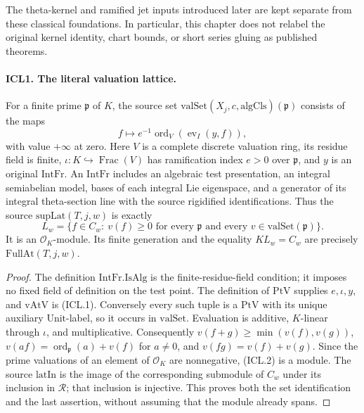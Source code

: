 The theta-kernel and ramified jet inputs introduced later are kept
separate from these classical foundations.  In particular, this chapter
does not relabel the original kernel identity, chart bounds, or short
series gluing as published theorems.

\paragraph{ICL1. The literal valuation lattice.}
\label{claim:ICL1}
For a finite prime \(\mathfrak p\) of \(K\), the source set
\(\mathrm{valSet}(X_j,c,\mathrm{algCls})(\mathfrak p)\) consists of the maps
\[
 f\longmapsto e^{-1}\operatorname{ord}_{V}
                 (\operatorname{ev}_{I}(y,f)),                 \tag{ICL.1}
\]
with value \(+\infty\) at zero.  Here \(V\) is a complete discrete
valuation ring, its residue field is finite, \(\iota:K\hookrightarrow
\operatorname{Frac}(V)\) has ramification index \(e>0\) over
\(\mathfrak p\), and \(y\) is an original \(\mathrm{IntFr}\).
An \(\mathrm{IntFr}\) includes an algebraic test presentation, an integral
semiabelian model, bases of each integral Lie eigenspace, and a generator
of its integral theta-section line with the source rigidified
identifications.  Thus the source \(\mathrm{supLat}(T,j,w)\) is exactly
\[
 L_w=\{f\in C_w:\ v(f)\geq0\text{ for every }\mathfrak p
           \text{ and every }v\in\mathrm{valSet}(\mathfrak p)\}. \tag{ICL.2}
\]
It is an \(\mathcal O_K\)-module.  Its finite generation and the equality
\(K L_w=C_w\) are precisely \(\mathrm{FullAt}(T,j,w)\).
\begin{proof}
The definition \(\mathrm{IntFr.IsAlg}\) is the finite-residue-field
condition; it imposes no fixed field of definition on the test point.
The definition of \(\mathrm{PtV}\) supplies \(e,\iota,y\), and
\(\mathrm{vAtV}\) is (ICL.1).  Conversely every such tuple is a
\(\mathrm{PtV}\) with its unique auxiliary \(\mathrm{Unit}\)-label,
so it occurs in \(\mathrm{valSet}\).  Evaluation is additive,
\(K\)-linear through \(\iota\), and multiplicative.  Consequently
\(v(f+g)\geq\min(v(f),v(g))\),
\(v(af)=\operatorname{ord}_{\mathfrak p}(a)+v(f)\) for \(a\ne0\),
and \(v(fg)=v(f)+v(g)\).  Since the prime valuations of an element
of \(\mathcal O_K\) are nonnegative, (ICL.2) is a module.  The
source \(\mathrm{latIn}\) is the image of the corresponding submodule
of \(C_w\) under its inclusion in \(\mathcal R\); that inclusion is
injective.  This proves both the set identification and the last
assertion, without assuming that the module already spans.
\end{proof}

